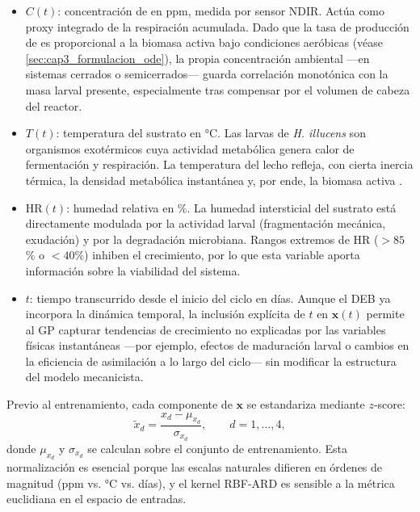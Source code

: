 \begin{itemize}
    \item $C(t)$: concentración de  en ppm, medida por sensor NDIR. Actúa como proxy integrado de la respiración acumulada. Dado que la tasa de producción de  es proporcional a la biomasa activa bajo condiciones aeróbicas (véase \cref{sec:cap3_formulacion_ode}), la propia concentración ambiental —en sistemas cerrados o semicerrados— guarda correlación monotónica con la masa larval presente, especialmente tras compensar por el volumen de cabeza del reactor.
    
    \item $T(t)$: temperatura del sustrato en °C. Las larvas de \textit{H. illucens} son organismos exotérmicos cuya actividad metabólica genera calor de fermentación y respiración. La temperatura del lecho refleja, con cierta inercia térmica, la densidad metabólica instantánea y, por ende, la biomasa activa \parencite{bekkerImpactSubstrateMoisture2021}.
    
    \item $\mathrm{HR}(t)$: humedad relativa en \%. La humedad intersticial del sustrato está directamente modulada por la actividad larval (fragmentación mecánica, exudación) y por la degradación microbiana. Rangos extremos de HR ($> \num{85}$\% o $< \num{40}$\%) inhiben el crecimiento, por lo que esta variable aporta información sobre la viabilidad del sistema.
    
    \item $t$: tiempo transcurrido desde el inicio del ciclo en días. Aunque el DEB ya incorpora la dinámica temporal, la inclusión explícita de $t$ en $\mathbf{x}(t)$ permite al GP capturar tendencias de crecimiento no explicadas por las variables físicas instantáneas —por ejemplo, efectos de maduración larval o cambios en la eficiencia de asimilación a lo largo del ciclo— sin modificar la estructura del modelo mecanicista.
\end{itemize}

Previo al entrenamiento, cada componente de $\mathbf{x}$ se estandariza mediante $z$-score:
\begin{equation}
    \label{eq:cap4_estandarizacion}
    \tilde{x}_d = \frac{x_d - \mu_{x_d}}{\sigma_{x_d}}, \qquad d = 1,\dots,4,
\end{equation}
donde $\mu_{x_d}$ y $\sigma_{x_d}$ se calculan sobre el conjunto de entrenamiento. Esta normalización es esencial porque las escalas naturales difieren en órdenes de magnitud (ppm vs. °C vs. días), y el kernel RBF-ARD es sensible a la métrica euclidiana en el espacio de entradas.

